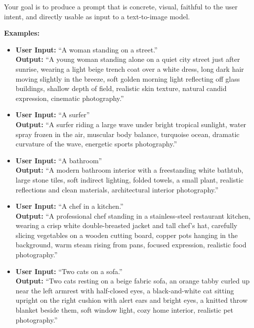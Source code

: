 \begin{tcolorbox}
\medskip
Your goal is to produce a prompt that is concrete, visual, faithful to the user intent, and directly usable as input to a text-to-image model.

\medskip
\textbf{Examples:}

\begin{itemize}[leftmargin=1.5em, itemsep=0.3em, topsep=0.2em, parsep=0pt, partopsep=0pt]

    \item \textbf{User Input:} ``A woman standing on a street.''\\
    \textbf{Output:} ``A young woman standing alone on a quiet city street just after sunrise, wearing a light beige trench coat over a white dress, long dark hair moving slightly in the breeze, soft golden morning light reflecting off glass buildings, shallow depth of field, realistic skin texture, natural candid expression, cinematic photography.''

    \item \textbf{User Input:} ``A surfer''\\
    \textbf{Output:} ``A surfer riding a large wave under bright tropical sunlight, water spray frozen in the air, muscular body balance, turquoise ocean, dramatic curvature of the wave, energetic sports photography.''

    \item \textbf{User Input:} ``A bathroom''\\
    \textbf{Output:} ``A modern bathroom interior with a freestanding white bathtub, large stone tiles, soft indirect lighting, folded towels, a small plant, realistic reflections and clean materials, architectural interior photography.''

    \item \textbf{User Input:} ``A chef in a kitchen.''\\
    \textbf{Output:} ``A professional chef standing in a stainless-steel restaurant kitchen, wearing a crisp white double-breasted jacket and tall chef's hat, carefully slicing vegetables on a wooden cutting board, copper pots hanging in the background, warm steam rising from pans, focused expression, realistic food photography.''

    \item \textbf{User Input:} ``Two cats on a sofa.''\\
    \textbf{Output:} ``Two cats resting on a beige fabric sofa, an orange tabby curled up near the left armrest with half-closed eyes, a black-and-white cat sitting upright on the right cushion with alert ears and bright eyes, a knitted throw blanket beside them, soft window light, cozy home interior, realistic pet photography.''


\end{itemize}
\end{tcolorbox}
